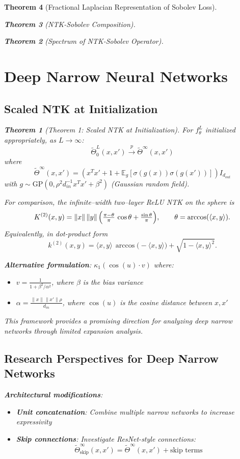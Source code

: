 \documentclass{article}
\newtheorem{theorem}{Theorem}[section]
\newcommand{\E}{\mathbb{E}}
\begin{document}
\begin{theorem}[Fractional Laplacian Representation of Sobolev Loss]
\begin{theorem}[NTK-Sobolev Composition]
\begin{theorem}[Spectrum of NTK-Sobolev Operator]
\section{Deep Narrow Neural Networks}

\subsection{Scaled NTK at Initialization}

\begin{theorem}[Theorem 1: Scaled NTK at Initialization]
For $f^L_\theta$ initialized appropriately, as $L \to \infty$:
\[ \tilde{\Theta}^L_0(x, x') \xrightarrow{p} \tilde{\Theta}^\infty(x, x') \]
where
\[ \tilde{\Theta}^\infty(x, x') = (x^T x' + 1 + \E_g[\sigma(g(x))\sigma(g(x'))]) I_{d_{out}} \]
with $g \sim \text{GP}(0, \rho^2 d_{in}^{-1} x^T x' + \beta^2)$ (Gaussian random field).
\end{theorem}

For comparison, the infinite–width two–layer ReLU NTK on the sphere is
\[
  K^{(2)}(x,y)=\|x\|\,\|y\|\,\Bigl(\tfrac{\pi-\theta}{\pi}\,\cos \theta + \tfrac{\sin\theta}{\pi}\Bigr),\qquad \theta=\arccos(\langle x,y\rangle).
\]
Equivalently, in dot-product form
\[
  k^{(2)}(x,y)=\langle x,y\rangle\,\arccos\bigl(-\langle x,y\rangle\bigr)+\sqrt{1-\langle x,y\rangle^{2}}.
\]

\textbf{Alternative formulation}: $\kappa_1(\cos(u) \cdot v)$ where:
\begin{itemize}
\item $v = \frac{1}{1 + \beta^2/\alpha^2}$, where $\beta$ is the bias variance
\item $\alpha = \frac{\|x\| \|x'\| \rho}{d_{in}}$, where $\cos(u)$ is the cosine distance between $x, x'$
\end{itemize}

This framework provides a promising direction for analyzing deep narrow networks through limited expansion analysis.

\subsection{Research Perspectives for Deep Narrow Networks}

\textbf{Architectural modifications}:
   \begin{itemize}
\item \textbf{Unit concatenation}: Combine multiple narrow networks to increase expressivity
\item \textbf{Skip connections}: Investigate ResNet-style connections:
  \[ \tilde{\Theta}^\infty_{\text{skip}}(x, x') = \tilde{\Theta}^\infty(x, x') + \text{skip terms} \]
   \end{itemize}


\end{theorem}
\end{theorem}
\end{theorem}
\end{document}
